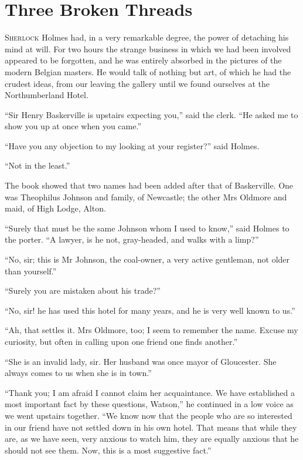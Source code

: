 \documentclass[paper=a5,BCOR=7mm,twoside,DIV=calc,12pt,usegeometry,openany,chapterprefix,endperiod,headings=big]{scrbook} %
\begin{document}
\chapter{Three Broken Threads}
\lettrine[lines=1]{S}{herlock} Holmes had, in a very remarkable degree, the power of detaching his mind at will. For two hours the strange business in which we had been involved appeared to be forgotten, and he was entirely absorbed in the pictures of the modern Belgian masters. He would talk of nothing but art, of which he had the crudest ideas, from our leaving the gallery until we found ourselves at the Northumberland Hotel.

\enquote{Sir Henry Baskerville is upstairs expecting you,} said the clerk. \enquote{He asked me to show you up at once when you came.}

\enquote{Have you any objection to my looking at your register?} said Holmes.

\enquote{Not in the least.}

The book showed that two names had been added after that of Baskerville. One was Theophilus Johnson and family, of Newcastle; the other Mrs Oldmore and maid, of High Lodge, Alton.

\enquote{Surely that must be the same Johnson whom I used to know,} said Holmes to the porter. \enquote{A lawyer, is he not, gray-headed, and walks with a limp?}

\enquote{No, sir; this is Mr Johnson, the coal-owner, a very active gentleman, not older than yourself.}

\enquote{Surely you are mistaken about his trade?}

\enquote{No, sir! he has used this hotel for many years, and he is very well known to us.}

\enquote{Ah, that settles it. Mrs Oldmore, too; I seem to remember the name. Excuse my curiosity, but often in calling upon one friend one finds another.}

\enquote{She is an invalid lady, sir. Her husband was once mayor of Gloucester. She always comes to us when she is in town.}

\enquote{Thank you; I am afraid I cannot claim her acquaintance. We have established a most important fact by these questions, Watson,} he continued in a low voice as we went upstairs together. \enquote{We know now that the people who are so interested in our friend have not settled down in his own hotel. That means that while they are, as we have seen, very anxious to watch him, they are equally anxious that he should not see them. Now, this is a most suggestive fact.}
\end{document}
